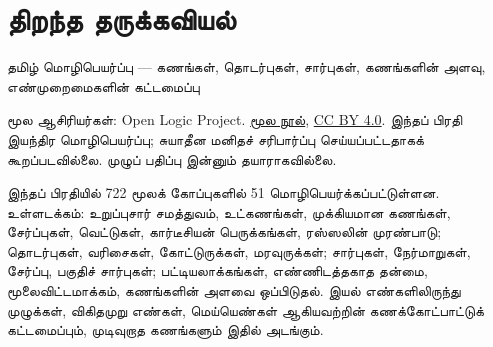 \documentclass[11pt,a4paper,openany]{memoir}
\begin{document}
\raggedright
\pagestyle{plain}
\chapter*{திறந்த தருக்கவியல்}
\noindent தமிழ் மொழிபெயர்ப்பு — கணங்கள், தொடர்புகள், சார்புகள், கணங்களின் அளவு, எண்முறைமைகளின் கட்டமைப்பு

\noindent மூல ஆசிரியர்கள்: Open Logic Project.
\href{https://github.com/OpenLogicProject/OpenLogic}{மூல நூல்},
\href{https://creativecommons.org/licenses/by/4.0/}{CC BY 4.0}.
இந்தப் பிரதி இயந்திர மொழிபெயர்ப்பு; சுயாதீன மனிதச் சரிபார்ப்பு செய்யப்பட்டதாகக்
கூறப்படவில்லை. முழுப் பதிப்பு இன்னும் தயாராகவில்லை.

\noindent இந்தப் பிரதியில் 722 மூலக் கோப்புகளில் 51 மொழிபெயர்க்கப்பட்டுள்ளன.
உள்ளடக்கம்: உறுப்புசார் சமத்துவம், உட்கணங்கள், முக்கியமான கணங்கள்,
சேர்ப்புகள், வெட்டுகள், கார்டீசியன் பெருக்கங்கள், ரஸ்ஸலின் முரண்பாடு;
தொடர்புகள், வரிசைகள், கோட்டுருக்கள், மரவுருக்கள்;
சார்புகள், நேர்மாறுகள், சேர்ப்பு, பகுதிச் சார்புகள்;
பட்டியலாக்கங்கள், எண்ணிடத்தகாத தன்மை, மூலைவிட்டமாக்கம்,
கணங்களின் அளவை ஒப்பிடுதல்.
இயல் எண்களிலிருந்து முழுக்கள், விகிதமுறு எண்கள், மெய்யெண்கள் ஆகியவற்றின்
கணக்கோட்பாட்டுக் கட்டமைப்பும், முடிவுறாத கணங்களும் இதில் அடங்கும்.

\clearpage
\tableofcontents*












\nocite{Frege1953}


\end{document}
